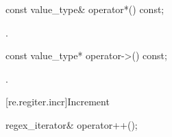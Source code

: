 %
\begin{itemdecl}
const value_type& operator*() const;
\end{itemdecl}

\begin{itemdescr}
\pnum
\returns
{}.
\end{itemdescr}

%
\begin{itemdecl}
const value_type* operator->() const;
\end{itemdecl}

\begin{itemdescr}
\pnum
\returns
{}.
\end{itemdescr}

[re.regiter.incr]{Increment}

%
%
\begin{itemdecl}
regex_iterator& operator++();
\end{itemdecl}

